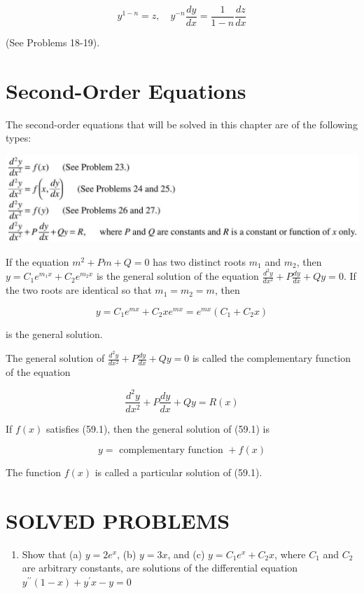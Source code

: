 \documentclass[10pt]{article}
\begin{document}
$$
y^{1-n}=z, \quad y^{-n} \frac{d y}{d x}=\frac{1}{1-n} \frac{d z}{d x}
$$

(See Problems 18-19).

\section*{Second-Order Equations}
The second-order equations that will be solved in this chapter are of the following types:

\begin{center}
\includegraphics[max width=\textwidth]{2024_04_20_fe2e8e718cc0fcd63d1bg-19}
\end{center}

If the equation $m^{2}+P m+Q=0$ has two distinct roots $m_{1}$ and $m_{2}$, then $y=C_{1} e^{m_{1} x}+C_{2} e^{m_{2} x}$ is the general solution of the equation $\frac{d^{2} y}{d x^{2}}+P \frac{d y}{d x}+Q y=0$. If the two roots are identical so that $m_{1}=m_{2}=m$, then

$$
y=C_{1} e^{m x}+C_{2} x e^{m x}=e^{m x}\left(C_{1}+C_{2} x\right)
$$

is the general solution.

The general solution of $\frac{d^{2} y}{d x^{2}}+P \frac{d y}{d x}+Q y=0$ is called the complementary function of the equation


\begin{equation*}
\frac{d^{2} y}{d x^{2}}+P \frac{d y}{d x}+Q y=R(x) \tag{59.1}
\end{equation*}


If $f(x)$ satisfies (59.1), then the general solution of (59.1) is

$$
y=\text { complementary function }+f(x)
$$

The function $f(x)$ is called a particular solution of (59.1).

\section*{SOLVED PROBLEMS}
\begin{enumerate}
  \item Show that (a) $y=2 e^{x}$, (b) $y=3 x$, and (c) $y=C_{1} e^{x}+C_{2} x$, where $C_{1}$ and $C_{2}$ are arbitrary constants, are solutions of the differential equation $y^{\prime \prime}(1-x)+y^{\prime} x-y=0$
\end{enumerate}
\end{document}
